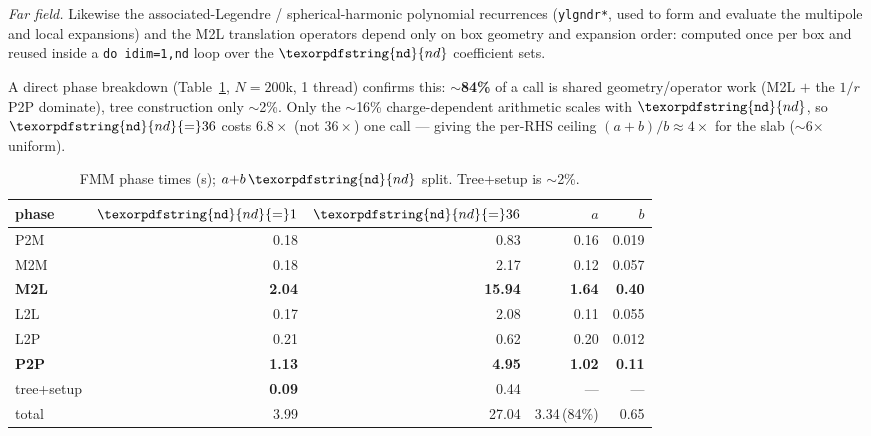 \documentclass[10pt]{article}
\newcommand{\nd}{\texorpdfstring{\texttt{nd}}{nd}}
\begin{document}
\emph{Far field.} Likewise the associated-Legendre / spherical-harmonic polynomial recurrences
(\texttt{ylgndr*}, used to form and evaluate the multipole and local expansions) and the M2L
translation operators depend only on box geometry and expansion order: computed once per box and
reused inside a \texttt{do idim=1,nd} loop over the $\nd$ coefficient sets.

A direct phase breakdown (Table~\ref{t:phase}, $N{=}200$k, 1 thread)
confirms this: $\sim$\textbf{84\%} of a call is shared geometry/operator work (M2L $+$ the $1/r$ P2P
dominate), tree construction only $\sim$2\%. Only the $\sim$16\% charge-dependent arithmetic scales
with $\nd$, so $\nd{=}36$ costs $6.8\times$ (not $36\times$) one call --- giving the per-RHS ceiling
$(a{+}b)/b\approx4\times$ for the slab ($\sim$6$\times$ uniform).

\begin{table}[h]\centering\footnotesize
\caption{FMM phase times (s); $a{+}b\,\nd$ split. Tree+setup is $\sim$2\%.}\label{t:phase}
\begin{tabular}{@{}lrrrr@{}}\toprule
phase & $\nd{=}1$ & $\nd{=}36$ & $a$ & $b$\\\midrule
P2M & 0.18 & 0.83 & 0.16 & 0.019\\
M2M & 0.18 & 2.17 & 0.12 & 0.057\\
\textbf{M2L} & \textbf{2.04} & \textbf{15.94} & \textbf{1.64} & \textbf{0.40}\\
L2L & 0.17 & 2.08 & 0.11 & 0.055\\
L2P & 0.21 & 0.62 & 0.20 & 0.012\\
\textbf{P2P} & \textbf{1.13} & \textbf{4.95} & \textbf{1.02} & \textbf{0.11}\\
tree+setup & \textbf{0.09} & 0.44 & --- & ---\\\midrule
total & 3.99 & 27.04 & 3.34\,(84\%) & 0.65\\\bottomrule
\end{tabular}
\end{table}
\end{document}
